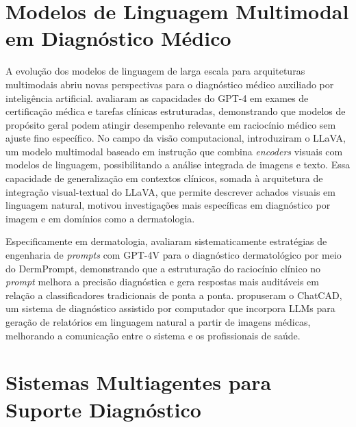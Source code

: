 \section{Modelos de Linguagem Multimodal em Diagnóstico Médico}

A evolução dos modelos de linguagem de larga escala para arquiteturas multimodais abriu novas perspectivas para o diagnóstico médico auxiliado por inteligência artificial.  avaliaram as capacidades do GPT-4 em exames de certificação médica e tarefas clínicas estruturadas, demonstrando que modelos de propósito geral podem atingir desempenho relevante em raciocínio médico sem ajuste fino específico. No campo da visão computacional,  introduziram o LLaVA, um modelo multimodal baseado em instrução que combina \textit{encoders} visuais com modelos de linguagem, possibilitando a análise integrada de imagens e texto. Essa capacidade de generalização em contextos clínicos, somada à arquitetura de integração visual-textual do LLaVA, que permite descrever achados visuais em linguagem natural, motivou investigações mais específicas em diagnóstico por imagem e em domínios como a dermatologia.

Especificamente em dermatologia,  avaliaram sistematicamente estratégias de engenharia de \textit{prompts} com GPT-4V para o diagnóstico dermatológico por meio do DermPrompt, demonstrando que a estruturação do raciocínio clínico no \textit{prompt} melhora a precisão diagnóstica e gera respostas mais auditáveis em relação a classificadores tradicionais de ponta a ponta.  propuseram o ChatCAD, um sistema de diagnóstico assistido por computador que incorpora LLMs para geração de relatórios em linguagem natural a partir de imagens médicas, melhorando a comunicação entre o sistema e os profissionais de saúde.


\section{Sistemas Multiagentes para Suporte Diagnóstico}

